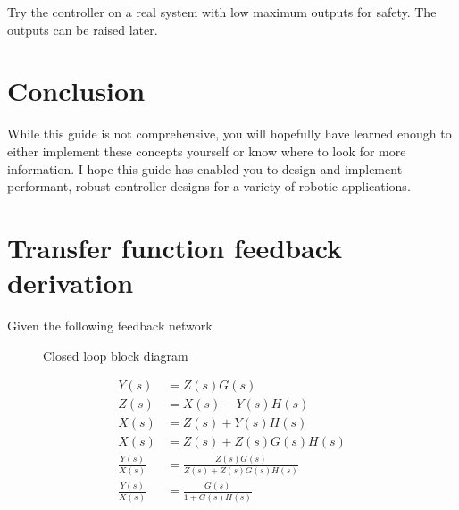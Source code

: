 \documentclass[10pt,conference,compsoc]{IEEEtran}
\begin{document}
Try the controller on a real \gls{system} with low maximum outputs for safety.
The outputs can be raised later.

\section{Conclusion}

While this guide is not comprehensive, you will hopefully have learned enough to
either implement these concepts yourself or know where to look for more
information. I hope this guide has enabled you to design and implement
performant, robust controller designs for a variety of robotic applications.

\appendices

\section{Transfer function feedback derivation}
\label{sec:app_tf_feedback_deriv}

Given the following feedback network \\

\begin{figure}[H]
  \centering


  \caption{Closed loop block diagram}
  \label{fig:closed_loop_deriv}
\end{figure}

\begin{align}
  Y(s) &= Z(s) G(s) \nonumber \\
  Z(s) &= X(s) - Y(s) H(s) \nonumber \\
  X(s) &= Z(s) + Y(s) H(s) \nonumber \\
  X(s) &= Z(s) + Z(s) G(s) H(s) \nonumber \\
  \frac{Y(s)}{X(s)} &= \frac{Z(s) G(s)}{Z(s) + Z(s) G(s) H(s)} \nonumber \\
  \frac{Y(s)}{X(s)} &= \frac{G(s)}{1 + G(s) H(s)}
\end{align}
\end{document}
